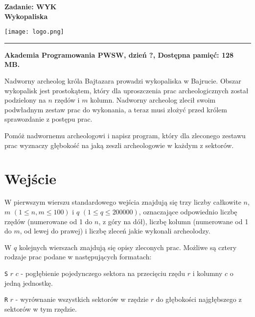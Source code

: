 \documentclass[10pt]{article}
\begin{document}
    

    \noindent
    \begin{minipage}{0.5\textwidth}
        \LARGE{\textsf{\textbf{Zadanie: WYK\\Wykopaliska}}}
    \end{minipage}
    \begin{minipage}{0.5\textwidth}
        \begin{flushright}
            \texttt{[image: logo.png]}
        \end{flushright}
    \end{minipage}
    
    \noindent\rule{\textwidth}{0.4pt}
    
    \noindent\textbf{Akademia Programowania PWSW, dzień ?, Dostępna pamięć: 128 MB.}
    \vspace{1em}
    
    
    \noindent
    Nadworny archeolog króla Bajtazara prowadzi wykopaliska w Bajrucie. Obszar wykopalisk jest prostokątem, który dla uproszczenia prac archeologicznych został podzielony na $n$ rzędów i $m$ kolumn. Nadworny archeolog zlecił swoim podwładnym zestaw prac do wykonania, a teraz musi złożyć przed królem sprawozdanie z postępu prac.
    
    Pomóż nadwornemu archeologowi i napisz program, który dla zleconego zestawu prac wyznaczy głębokość na jaką zeszli archeologowie w każdym z sektorów.


    \section*{Wejście}
    
    W pierwszym wierszu standardowego wejścia znajdują się trzy liczby całkowite $n$, $m$ $(1\leq n, m\leq 100)$ i $q$ $(1\leq q\leq 200000)$, oznaczające odpowiednio liczbę rzędów (numerowane od 1 do $n$, z góry na dół), liczbę kolumn (numerowane od 1 do $m$, od lewej do prawej) i liczbę zleceń jakie wykonali archeolodzy.

    W $q$ kolejnych wierszach znajdują się opisy zleconych prac. Możliwe są cztery rodzaje prac podane w następujących formatach:

    \texttt{S} $r$ $c$ - pogłębienie pojedynczego sektora na przecięciu rzędu $r$ i kolumny $c$ o jedną jednostkę. 

    \texttt{R} $r$ - wyrównanie wszystkich sektorów w rzędzie $r$ do głębokości najgłębszego z sektorów w tym rzędzie. 
\end{document}

